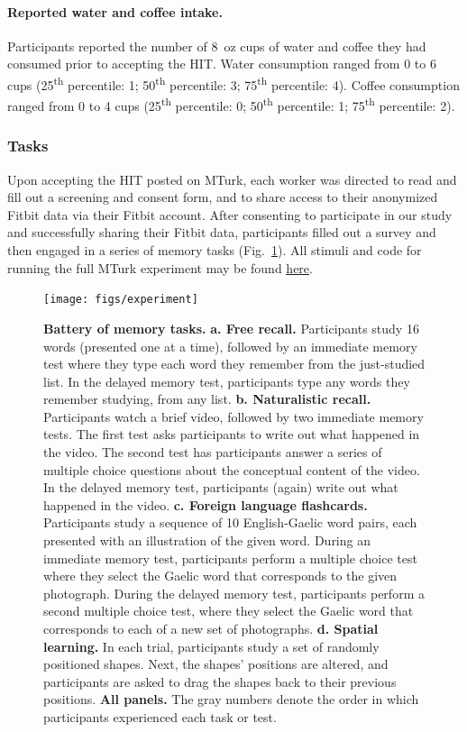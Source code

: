 \documentclass[10pt]{article}
\begin{document}
\paragraph{Reported water and coffee intake.}
Participants reported the number of 8~oz cups of water and coffee they had
consumed prior to accepting the HIT.  Water consumption ranged from 0 to 6 cups (25\textsuperscript{th} percentile: 1;
50\textsuperscript{th} percentile: 3; 75\textsuperscript{th}
percentile: 4).  Coffee consumption ranged from 0 to 4 cups (25\textsuperscript{th} percentile: 0;
50\textsuperscript{th} percentile: 1; 75\textsuperscript{th}
percentile: 2).


\subsubsection*{Tasks}
Upon accepting the HIT posted on MTurk, each worker was
directed to read and fill out a screening and consent form, and to
share access to their anonymized Fitbit data via their Fitbit account.
After consenting to participate in our study and successfully sharing their Fitbit
data, participants filled out a survey and then engaged in a series of
memory tasks (Fig.~\ref{fig:tasks}).  All stimuli and code for running
the full MTurk experiment may be found
\href{https://github.com/ContextLab/brainfit-task}{\underline{here}}.

\begin{figure}[tp]
\centering
\texttt{[image: figs/experiment]}
\caption{\textbf{Battery of memory tasks.}  \textbf{a.  Free recall.}
Participants study 16 words (presented one at a time), followed by an
immediate memory test where they type
each word they remember from the just-studied list.  In the delayed
memory test, participants type any words they remember studying, from
any list.  \textbf{b. Naturalistic recall.}  Participants watch a
brief video, followed by two immediate memory tests.  The first test
asks participants to write out what happened in the video.  The second
test has participants answer a series of multiple choice questions
about the conceptual content of the video.  In the delayed memory
test, participants (again) write out what happened in the video.
\textbf{c. Foreign language flashcards.}  Participants study a
sequence of 10 English-Gaelic word pairs, each presented with an
illustration of the given word.  During an immediate memory test,
participants perform a multiple choice test where they select the
Gaelic word that corresponds to the given photograph.  During the
delayed memory test, participants perform a second multiple choice
test, where they select the Gaelic word that corresponds to each of a
new set of photographs.  \textbf{d. Spatial learning.}  In each trial,
participants
study a set of randomly positioned shapes.  Next, the shapes'
positions are altered, and participants are asked to drag the shapes
back to their previous positions.  \textbf{All panels.}  The gray
numbers denote the order in which participants experienced each task
or test.}
\label{fig:tasks}
\end{figure}
\end{document}
